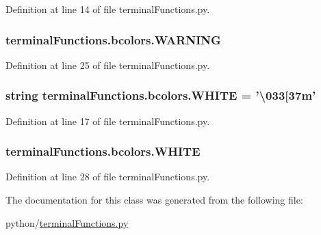 Definition at line 14 of file terminal\-Functions.\-py.

\subsubsection[{W\-A\-R\-N\-I\-N\-G}]{\setlength{\rightskip}{0pt plus 5cm}terminal\-Functions.\-bcolors.\-W\-A\-R\-N\-I\-N\-G}\label{classterminalFunctions_1_1bcolors_ad7b2abb068f6d284e8f067bbdaf57775}


Definition at line 25 of file terminal\-Functions.\-py.

\subsubsection[{W\-H\-I\-T\-E}]{\setlength{\rightskip}{0pt plus 5cm}string terminal\-Functions.\-bcolors.\-W\-H\-I\-T\-E = '\textbackslash{}033\mbox{[}37m'\hspace{0.3cm}{\ttfamily [static]}}\label{classterminalFunctions_1_1bcolors_a1c93718cb5187b6b7523a334b0650a38}


Definition at line 17 of file terminal\-Functions.\-py.

\subsubsection[{W\-H\-I\-T\-E}]{\setlength{\rightskip}{0pt plus 5cm}terminal\-Functions.\-bcolors.\-W\-H\-I\-T\-E}\label{classterminalFunctions_1_1bcolors_ad40bf7cbe951ff7023120aebb45b4d1b}


Definition at line 28 of file terminal\-Functions.\-py.



The documentation for this class was generated from the following file\-:\begin{DoxyCompactItemize}
\item 
python/\hyperlink{terminalFunctions_8py}{terminal\-Functions.\-py}\end{DoxyCompactItemize}
